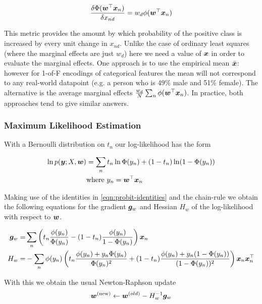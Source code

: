 \begin{equation}
\frac{\delta \Phi(\bm w^\top\bm x_n)}{\delta x_{nd}} = w_d \phi(\bm w^\top\bm x_n)
\end{equation}

This metric provides the amount by which probability of the positive class is increased by every unit change in $x_{nd}$. Unlike the case of ordinary least squares (where the marginal effects are just $w_d$) here we need a value of $\bm x$ in order to evaluate the marginal effects. One approach is to use the empirical mean $\bar{\bm x}$: however for 1-of-F encodings of categorical features the mean will not correspond to any real-world datapoint (e.g. a person who is 49\% male and 51\% female). The alternative is the average marginal effects $\frac{w_d}{N}\sum_n\phi(\bm w^\top\bm x_n)$. In practice, both approaches tend to give similar answers.



\subsubsection*{Maximum Likelihood Estimation}
With a Bernoulli distribution on $t_n$ our log-likelihood has the form

\begin{align}
\ln p(\bm y; X, \bm w) & = \sum_n t_n \ln \Phi(y_n) + (1 - t_n) \ln (1 - \Phi(y_n)) \\
& \text{where } y_n = \bm w^\top\bm x_n
\end{align}

Making use of the identities in \eqref{eqn:probit-identities} and the chain-rule we obtain the following equations for the gradient $\bm g_w$ and Hessian $H_w$ of the log-likelihood with respect to $\bm w$.

\begin{align}
\bm g_w = & \sum_n \left( t_n \frac{\phi(y_n)}{\Phi(y_n)} - (1 - t_n) \frac{\phi(y_n)}{1 - \Phi(y_n)} \right) \bm x_n \label{eqn:probit-gradient}\\
H_w = & - \sum_n \phi(y_n) \left(
    t_n \frac{\phi(y_n) + y_n \Phi(y_n)}{\Phi(y_n)^2} + (1-t_n) \frac{\phi(y_n) + y_n (1-\Phi(y_n))}{(1 - \Phi(y_n))^2}
\right) \bm x_n \bm x_n^\top \label{eqn:probit-hessian}
\end{align}

With this we obtain the usual Newton-Raphson update
\begin{align}
\bm w^{(\text{new})} \leftarrow \bm w^{(old)} - H_w^{-1} \bm g_w
\end{align}

